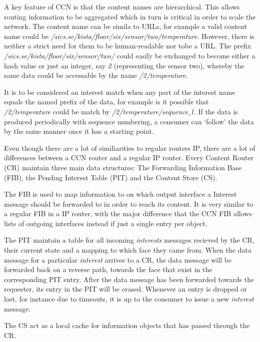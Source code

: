 A key feature of CCN is that the content names are hierarchical. This allows routing information to be aggregated which in turn is critical in order to scale the network. The content name can be simila to URLs, for example a valid content name could be \textit{/sics.se/kista/floor/six/sensor/two/temperature}. However, there is neither a strict need for them to be human-readable nor tobe a URL. The prefix \textit{/sics.se/kista/floor/six/sensor/two/} could easily be exchanged to become either a hash value or just an integer, say \textit{2} (representing the sensor two), whereby the same data could be accessable by the name \textit{/2/temperature}.

It is to be considered an interest match  when any part of the interest name equals the named prefix of the data, for example is it possible that \textit{/2/temperature} could be match by \textit{/2/temperature/sequence$\_$1}. If the data is produced periodically with sequence numbering, a consumer can `follow' the data by the same manner once it has a starting point. %

Even though there are a lot of similiarities to regular routers IP, there are a lot of differences between a CCN router and a regular IP router.
Every Content Router (CR) maintain three main data structures: The Forwarding Information Base (FIB), the Pending Interest Table (PIT) and the Content Store (CS).

The FIB is used to map information to on which output interface a Interest message should be forwarded to in order to reach its content. It is very similar to a regular FIB in a IP router, with the major difference that the CCN FIB allows lists of outgoing interfaces instead if just a single entry per object.

The PIT maintain a table for all incoming \textit{interests} messages recieved by the CR, their current state and a mapping to which face they came from. When the data message for a particular \textit{interest} arrives to a CR, the data message will be forwarded back on a reverse path, towards the face that exist in the corresponding PIT entry. After the data message has been forwarded towards the requester, its entry in the PIT will be erased. Whenever an entry is dropped or lost, for instance due to timeouts, it is up to the consumer to issue a new \textit{interest} message.\

The CS act as a local cache for information objects that has passed through the CR.

